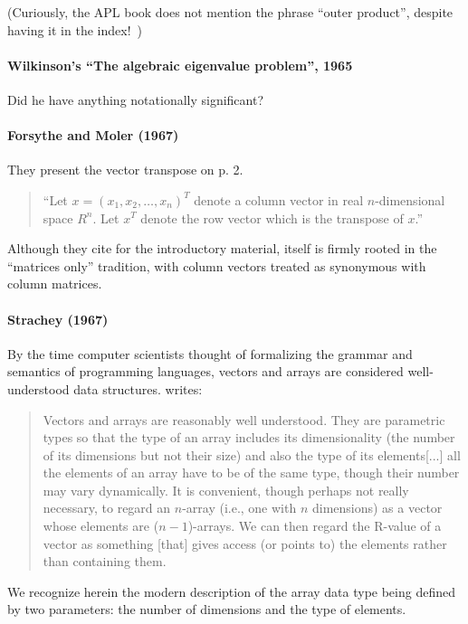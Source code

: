 (Curiously, the APL book does not mention the phrase ``outer product'', despite having it in the index!~\cite{Iverson1962book})


\paragraph{Wilkinson's ``The algebraic eigenvalue problem'', 1965}

Did he have anything notationally significant?



\paragraph{Forsythe and Moler (1967)~\cite{Forsythe1967}}

They present the vector transpose on p. 2.
\begin{quote}
``Let $x = {(x_1, x_2, \dots, x_n)}^T$ denote a column vector in real $n$-dimensional space $R^n$. Let $x^T$ denote the row vector which is the transpose of $x$.''~\cite[p. 2]{Forsythe1967}
\end{quote}

Although they cite \cite{Faddeev1959} for the introductory material, \cite{Faddeev1959} itself is firmly rooted in the ``matrices only'' tradition, with column vectors treated as synonymous with column matrices.



\paragraph{Strachey (1967)~\cite{Strachey1967}}

By the time computer scientists thought of formalizing the grammar and semantics of programming languages,
vectors and arrays are considered well-understood data structures. \cite[\S 3.7.7, pp. 43--44]{Strachey1967} writes:
\begin{quote}
Vectors and arrays are reasonably well understood. They are parametric types so that the type of an array includes its dimensionality (the number of
its dimensions but not their size) and also the type of its elements[...]
all the elements of an array have to be of the same type, though their number may vary dynamically.
It is convenient, though perhaps not really necessary, to regard an $n$-array
(i.e., one with $n$ dimensions) as a vector whose elements are ($n-1$)-arrays.
We can then regard the R-value of a vector as something [that] gives access (or points to) the elements rather than containing them.
\end{quote}
We recognize herein the modern description of the array data type being defined by
two parameters: the number of dimensions and the type of elements.

